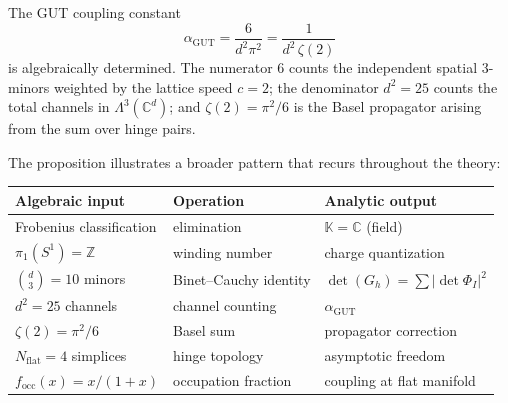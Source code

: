 \begin{proposition}
\label{prop:alpha_algebraic}
The GUT coupling constant
\begin{equation}
\alpha_{\mathrm{GUT}} = \frac{6}{d^2 \pi^2} = \frac{1}{d^2\,\zeta(2)}
\end{equation}
is algebraically determined. The numerator $6$ counts the independent spatial $3$-minors weighted by the lattice speed $c = 2$; the denominator $d^2 = 25$ counts the total channels in $\Lambda^3(\mathbb{C}^d)$; and $\zeta(2) = \pi^2/6$ is the Basel propagator arising from the sum over hinge pairs.
\end{proposition}

The proposition illustrates a broader pattern that recurs throughout the theory:

\begin{center}
\begin{tabular}{lll}
\toprule
\textbf{Algebraic input} & \textbf{Operation} & \textbf{Analytic output} \\
\midrule
Frobenius classification & elimination & $\mathbb{K} = \mathbb{C}$ (field) \\
$\pi_1(S^1) = \mathbb{Z}$ & winding number & charge quantization \\
$\binom{d}{3} = 10$ minors & Binet--Cauchy identity & $\det(G_h) = \sum|\det \Phi_I|^2$ \\
$d^2 = 25$ channels & channel counting & $\alpha_{\mathrm{GUT}}$ \\
$\zeta(2) = \pi^2/6$ & Basel sum & propagator correction \\
$N_{\mathrm{flat}} = 4$ simplices & hinge topology & asymptotic freedom \\
$f_{\mathrm{occ}}(x) = x/(1+x)$ & occupation fraction & coupling at flat manifold \\
\bottomrule
\end{tabular}
\end{center}

